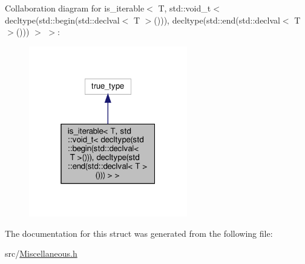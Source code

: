 Collaboration diagram for is\+\_\+iterable$<$ T, std\+:\+:void\+\_\+t$<$ decltype(std\+:\+:begin(std\+:\+:declval$<$ T $>$())), decltype(std\+:\+:end(std\+:\+:declval$<$ T $>$())) $>$ $>$\+:
\nopagebreak
\begin{figure}[H]
\begin{center}
\leavevmode
\includegraphics[width=196pt]{structis__iterable_3_01_t_00_01std_1_1void__t_3_01decltype_07std_1_1begin_07std_1_1declval_3_01_b067d8048764f6340460e1309cc193bd}
\end{center}
\end{figure}


The documentation for this struct was generated from the following file\+:\begin{DoxyCompactItemize}
\item 
src/\hyperlink{_miscellaneous_8h}{Miscellaneous.\+h}\end{DoxyCompactItemize}
